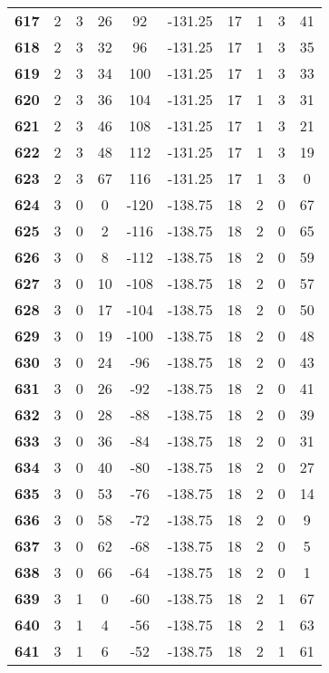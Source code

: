 \documentclass[12pt,letterpaper, onecolumn]{exam}
\begin{document}
\begin{longtable}{cccccccccc}
    \textbf{617} & 2 & 3 & 26 & 92 & -131.25 & 17 & 1 & 3 & 41 \\ 
    \textbf{618} & 2 & 3 & 32 & 96 & -131.25 & 17 & 1 & 3 & 35 \\ 
    \textbf{619} & 2 & 3 & 34 & 100 & -131.25 & 17 & 1 & 3 & 33 \\ 
    \textbf{620} & 2 & 3 & 36 & 104 & -131.25 & 17 & 1 & 3 & 31 \\ 
    \textbf{621} & 2 & 3 & 46 & 108 & -131.25 & 17 & 1 & 3 & 21 \\ 
    \textbf{622} & 2 & 3 & 48 & 112 & -131.25 & 17 & 1 & 3 & 19 \\ 
    \textbf{623} & 2 & 3 & 67 & 116 & -131.25 & 17 & 1 & 3 & 0 \\ 
    \textbf{624} & 3 & 0 & 0 & -120 & -138.75 & 18 & 2 & 0 & 67 \\ 
    \textbf{625} & 3 & 0 & 2 & -116 & -138.75 & 18 & 2 & 0 & 65 \\ 
    \textbf{626} & 3 & 0 & 8 & -112 & -138.75 & 18 & 2 & 0 & 59 \\ 
    \textbf{627} & 3 & 0 & 10 & -108 & -138.75 & 18 & 2 & 0 & 57 \\ 
    \textbf{628} & 3 & 0 & 17 & -104 & -138.75 & 18 & 2 & 0 & 50 \\ 
    \textbf{629} & 3 & 0 & 19 & -100 & -138.75 & 18 & 2 & 0 & 48 \\ 
    \textbf{630} & 3 & 0 & 24 & -96 & -138.75 & 18 & 2 & 0 & 43 \\ 
    \textbf{631} & 3 & 0 & 26 & -92 & -138.75 & 18 & 2 & 0 & 41 \\ 
    \textbf{632} & 3 & 0 & 28 & -88 & -138.75 & 18 & 2 & 0 & 39 \\ 
    \textbf{633} & 3 & 0 & 36 & -84 & -138.75 & 18 & 2 & 0 & 31 \\ 
    \textbf{634} & 3 & 0 & 40 & -80 & -138.75 & 18 & 2 & 0 & 27 \\ 
    \textbf{635} & 3 & 0 & 53 & -76 & -138.75 & 18 & 2 & 0 & 14 \\ 
    \textbf{636} & 3 & 0 & 58 & -72 & -138.75 & 18 & 2 & 0 & 9 \\ 
    \textbf{637} & 3 & 0 & 62 & -68 & -138.75 & 18 & 2 & 0 & 5 \\ 
    \textbf{638} & 3 & 0 & 66 & -64 & -138.75 & 18 & 2 & 0 & 1 \\ 
    \textbf{639} & 3 & 1 & 0 & -60 & -138.75 & 18 & 2 & 1 & 67 \\ 
    \textbf{640} & 3 & 1 & 4 & -56 & -138.75 & 18 & 2 & 1 & 63 \\ 
    \textbf{641} & 3 & 1 & 6 & -52 & -138.75 & 18 & 2 & 1 & 61 \\ 

\end{longtable}
\end{document}
